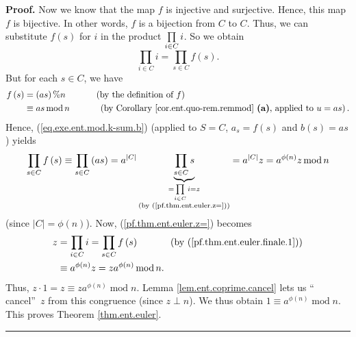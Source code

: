 \documentclass[numbers=enddot,12pt,final,onecolumn,notitlepage]{scrartcl}%
\numberwithin{exer}{subsection}
\theoremstyle{definition}
\newenvironment{proof}[1][Proof]{\noindent\textbf{#1.} }{\ \rule{0.5em}{0.5em}}
\let\prodnonlimits\prod
\renewcommand{\prod}{\prodnonlimits\limits}
\begin{document}
\begin{proof}
Now we know that the map $f$ is injective and surjective. Hence, this map $f$
is bijective. In other words, $f$ is a bijection from $C$ to $C$. Thus, we can
substitute $f\left(  s\right)  $ for $i$ in the product $\prod\limits_{i\in
C}i$. So we obtain%
\begin{equation}
\prod_{i\in C}i=\prod_{s\in C}f\left(  s\right)  .
\label{pf.thm.ent.euler.finale.1}%
\end{equation}
But for each $s\in C$, we have%
\begin{align*}
f\left(  s\right)   &  =\left(  as\right)  \%n\ \ \ \ \ \ \ \ \ \ \left(
\text{by the definition of }f\right) \\
&  \equiv as\operatorname{mod}n\ \ \ \ \ \ \ \ \ \ \left(  \text{by Corollary
\ref{cor.ent.quo-rem.remmod} \textbf{(a)}, applied to }u=as\right)  .
\end{align*}
Hence, (\ref{eq.exe.ent.mod.k-sum.b}) (applied to $S=C$, $a_{s}=f\left(
s\right)  $ and $b\left(  s\right)  =as$) yields%
\[
\prod_{s\in C}f\left(  s\right)  \equiv\prod_{s\in C}\left(  as\right)
=a^{\left\vert C\right\vert }\underbrace{\prod_{s\in C}s}_{\substack{=\prod
_{i\in C}i=z\\\text{(by (\ref{pf.thm.ent.euler.z=}))}}}=a^{\left\vert
C\right\vert }z=a^{\phi\left(  n\right)  }z\operatorname{mod}n
\]
(since $\left\vert C\right\vert =\phi\left(  n\right)  $). Now,
(\ref{pf.thm.ent.euler.z=}) becomes%
\begin{align*}
z  &  =\prod_{i\in C}i=\prod_{s\in C}f\left(  s\right)
\ \ \ \ \ \ \ \ \ \ \left(  \text{by (\ref{pf.thm.ent.euler.finale.1})}\right)
\\
&  \equiv a^{\phi\left(  n\right)  }z=za^{\phi\left(  n\right)  }%
\operatorname{mod}n.
\end{align*}
Thus, $z\cdot1=z\equiv za^{\phi\left(  n\right)  }\operatorname{mod}n$. Lemma
\ref{lem.ent.coprime.cancel} lets us \textquotedblleft
cancel\textquotedblright\ $z$ from this congruence (since $z\perp n$). We thus
obtain $1\equiv a^{\phi\left(  n\right)  }\operatorname{mod}n$. This proves
Theorem \ref{thm.ent.euler}.
\end{proof}
\end{document}
